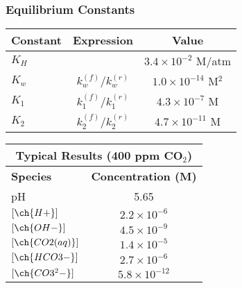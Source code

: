 \frametitle{Equilibrium Constants}
\vspace{-0.22in}
\begin{table}
\centering
\begin{tabular}{|l|c|c|}
\hline
\textbf{Constant} & \textbf{Expression} & \textbf{Value} \\
\hline
$K_H$ & & $3.4 \times 10^{-2}$ M/atm \\[0.2cm]
$K_w$ & $k_{w}^{(f)} / k_{w}^{(r)}$ & $1.0 \times 10^{-14}$ M$^2$ \\[0.2cm]
$K_1$ & $k_{1}^{(f)} / k_{1}^{(r)}$ & $4.3 \times 10^{-7}$ M \\[0.2cm]
$K_2$ & $k_{2}^{(f)} / k_{2}^{(r)}$ & $4.7 \times 10^{-11}$ M \\
\hline
\end{tabular}
\end{table}
\begin{table}
\centering
\begin{tabular}{|l|c|}
\hline
\multicolumn{2}{|c|}{\textbf{Typical Results (400 ppm CO$_2$)}} \\
\hline
\textbf{Species} & \textbf{Concentration (M)} \\
\hline
pH & 5.65 \\
$[\ch{H+}]$ & $2.2 \times 10^{-6}$ \\
$[\ch{OH-}]$ & $4.5 \times 10^{-9}$ \\
$[\ch{CO2(aq)}]$ & $1.4 \times 10^{-5}$ \\
$[\ch{HCO3-}]$ & $2.7 \times 10^{-6}$ \\
$[\ch{CO3^2-}]$ & $5.8 \times 10^{-12}$ \\
\hline
\end{tabular}
\end{table}

